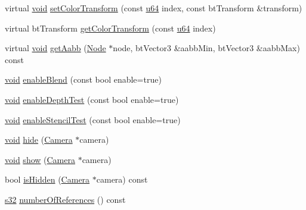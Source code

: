 \begin{DoxyCompactItemize}
\item 
virtual \mbox{\hyperlink{_thread_8h_af1e856da2e658414cb2456cb6f7ebc66}{void}} \mbox{\hyperlink{classnjli_1_1_geometry_aa0cc2acc76701fd62efdcddd802e4cda}{set\+Color\+Transform}} (const \mbox{\hyperlink{_util_8h_ad758b7a5c3f18ed79d2fcd23d9f16357}{u64}} index, const bt\+Transform \&transform)
\item 
virtual bt\+Transform \mbox{\hyperlink{classnjli_1_1_geometry_ae7af4b2e9fb67dbc658492290aeeacad}{get\+Color\+Transform}} (const \mbox{\hyperlink{_util_8h_ad758b7a5c3f18ed79d2fcd23d9f16357}{u64}} index)
\item 
virtual \mbox{\hyperlink{_thread_8h_af1e856da2e658414cb2456cb6f7ebc66}{void}} \mbox{\hyperlink{classnjli_1_1_geometry_a79efc86c5c96b88d33adfdc3debcddd4}{get\+Aabb}} (\mbox{\hyperlink{classnjli_1_1_node}{Node}} $\ast$node, bt\+Vector3 \&aabb\+Min, bt\+Vector3 \&aabb\+Max) const
\item 
\mbox{\hyperlink{_thread_8h_af1e856da2e658414cb2456cb6f7ebc66}{void}} \mbox{\hyperlink{classnjli_1_1_geometry_a12bd5b2725ed4ec11cd48d4fc365f644}{enable\+Blend}} (const bool enable=true)
\item 
\mbox{\hyperlink{_thread_8h_af1e856da2e658414cb2456cb6f7ebc66}{void}} \mbox{\hyperlink{classnjli_1_1_geometry_a4270551bf9c0f0ade7ce5b0fd16f78d8}{enable\+Depth\+Test}} (const bool enable=true)
\item 
\mbox{\hyperlink{_thread_8h_af1e856da2e658414cb2456cb6f7ebc66}{void}} \mbox{\hyperlink{classnjli_1_1_geometry_a66c3dcdcfb2fcc30bc0520f280b87ab0}{enable\+Stencil\+Test}} (const bool enable=true)
\item 
\mbox{\hyperlink{_thread_8h_af1e856da2e658414cb2456cb6f7ebc66}{void}} \mbox{\hyperlink{classnjli_1_1_geometry_ac369079a8761aeabf7fcef930690db42}{hide}} (\mbox{\hyperlink{classnjli_1_1_camera}{Camera}} $\ast$camera)
\item 
\mbox{\hyperlink{_thread_8h_af1e856da2e658414cb2456cb6f7ebc66}{void}} \mbox{\hyperlink{classnjli_1_1_geometry_a2778a40635e95c7c7059aa7ce9007290}{show}} (\mbox{\hyperlink{classnjli_1_1_camera}{Camera}} $\ast$camera)
\item 
bool \mbox{\hyperlink{classnjli_1_1_geometry_ac73f3369c9be097e8cd534ca42401c9b}{is\+Hidden}} (\mbox{\hyperlink{classnjli_1_1_camera}{Camera}} $\ast$camera) const
\item 
\mbox{\hyperlink{_util_8h_aa62c75d314a0d1f37f79c4b73b2292e2}{s32}} \mbox{\hyperlink{classnjli_1_1_geometry_a555e9b90676b286bf036902e164e6fa4}{number\+Of\+References}} () const
\item 

\end{DoxyCompactItemize}
